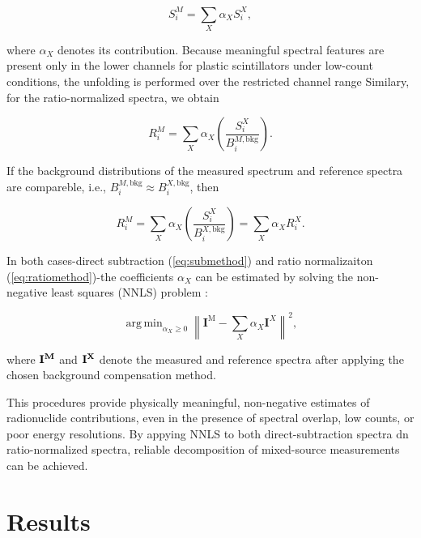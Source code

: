 \documentclass[10pt]{wlscirep}
\DeclareMathOperator*{\argmin}{arg\,min} %
\begin{document}
\begin{equation}
S_i^M = \sum_X \alpha_X S_i^X,\label{eq:submethod}
\end{equation}

\noindent where $\alpha_X$ denotes its contribution. Because meaningful spectral features are present only in the lower channels for plastic scintillators under low-count conditions, the unfolding is performed over the restricted channel range Similary, for the ratio-normalized spectra, we obtain

\begin{equation*}
R_i^M = \sum_X \alpha_X \left(\dfrac{S_i^X}{B_i^{M,\text{bkg}}}\right).
\end{equation*}

If the background distributions of the measured spectrum and reference spectra are compareble, i.e., $B^{M,\text{bkg}}_i \approx B_i^{X,\text{bkg}}$, then

\begin{equation}
R_i^M = \sum_X \alpha_X \left(\dfrac{S_i^X}{B_i^{X,\text{bkg}}}\right) = \sum_X \alpha_X R_i^X.\label{eq:ratiomethod}
\end{equation}

In both cases-direct subtraction (\ref{eq:submethod}) and ratio normalizaiton (\ref{eq:ratiomethod})-the coefficients $\alpha_X$ can be estimated by solving the non-negative least squares (NNLS) problem :

\begin{equation}
\argmin_{\alpha_X \ge 0} \left\| \textbf{I}^{\text{M}} - \sum_{X} \alpha_X \textbf{I}^{X}\right\|^2,\label{eqn:llns}
\end{equation}

where $\bf{I}^M$ and $\bf{I}^{X}$ denote the measured and reference spectra after applying the chosen background compensation method.

This procedures provide physically meaningful, non-negative estimates of radionuclide contributions, even in the presence of spectral overlap, low counts, or poor energy resolutions. By appying NNLS to both direct-subtraction spectra dn ratio-normalized spectra, reliable decomposition of mixed-source measurements can be achieved.

\section*{Results}

\end{document}
